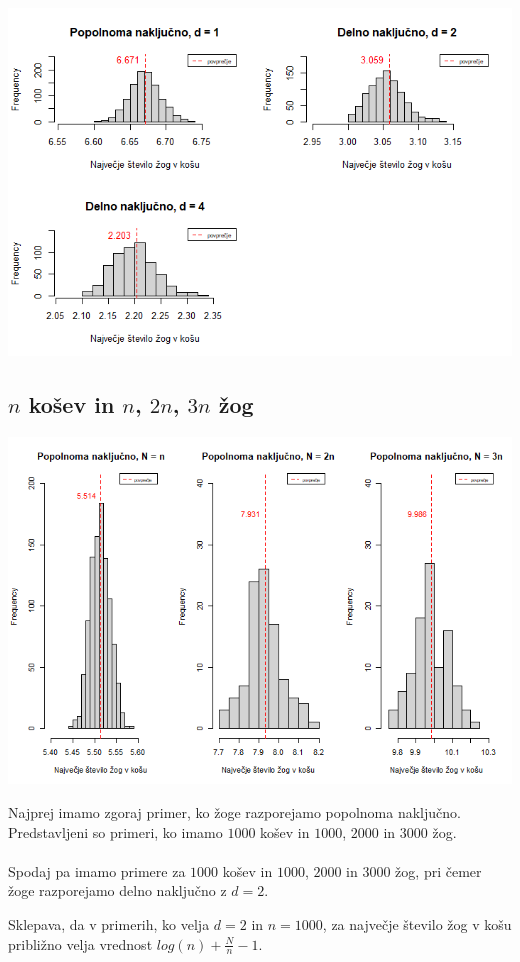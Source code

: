 \documentclass[a4paper, 11pt]{article}
\begin{document}
\includegraphics[scale=0.6]{delno_nakljucno.png}

\subsection{$n$ košev in $n$, $2n$, $3n$ žog}

\includegraphics[scale=0.60]{popolnoma_nakljucno2.png}

Najprej imamo zgoraj primer, ko žoge razporejamo popolnoma naključno.
Predstavljeni so primeri, ko imamo $1000$ košev in $1000$, $2000$ in $3000$ žog.
\\
\\
Spodaj pa imamo primere za $1000$ košev in $1000$, $2000$ in $3000$ žog, pri čemer žoge 
razporejamo delno naključno z $d = 2$. 

Sklepava, da v primerih, ko velja $d = 2$ in $n = 1000$, za največje število žog v košu približno
velja vrednost $log(n) + \frac{N}{n} -1$. 
\end{document}
